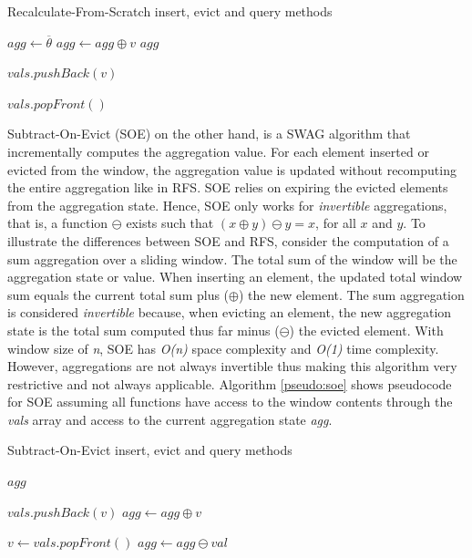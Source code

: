 \begin{algorithm}
    \caption[Recalculate-From-Scratch]{Recalculate-From-Scratch insert, evict and query methods}
    \label{pseudo:rfs}
    \begin{algorithmic}[1]
            \State $agg\gets\overline{\theta}$
                \State $agg \gets agg \oplus v$
            \EndFor
            \State \Return $agg$
        \EndFunction
        
            \State $vals.pushBack(v)$
        \EndFunction
        
            \State $vals.popFront()$
        \EndFunction
    \end{algorithmic}
\end{algorithm}

Subtract-On-Evict (SOE) on the other hand, is a SWAG algorithm that incrementally computes the aggregation value. For each element inserted or evicted from the window, the aggregation value is updated without recomputing the entire aggregation like in RFS. SOE relies on expiring the evicted elements from the aggregation state. Hence, SOE only works for \textit{invertible} aggregations, that is, a function $\ominus$ exists such that $(x \oplus y) \ominus y = x$, for all $x$ and $y$. To illustrate the differences between SOE and RFS, consider the computation of a sum aggregation over a sliding window. The total sum of the window will be the aggregation state or value. When inserting an element, the updated total window sum equals the current total sum plus ($\oplus$) the new element. The sum aggregation is considered \textit{invertible} because, when evicting an element, the new aggregation state is the total sum computed thus far minus ($\ominus$) the evicted element. With window size of \textit{n}, SOE has \textit{O(n)} space complexity and \textit{O(1)} time complexity. However, aggregations are not always invertible thus making this algorithm very restrictive and not always applicable. Algorithm \ref{pseudo:soe} shows pseudocode for SOE assuming all functions have access to the window contents through the \textit{vals} array and access to the current aggregation state \textit{agg}.

\begin{algorithm}
    \caption[Subtract-On-Evict]{Subtract-On-Evict insert, evict and query methods}
    \label{pseudo:soe}
    \begin{algorithmic}[1]
            \State \Return $agg$
        \EndFunction
        
            \State $vals.pushBack(v)$
            \State $agg \gets agg \oplus v$
        \EndFunction
        
            \State $v \gets vals.popFront()$
            \State $agg \gets agg \ominus val$
        \EndFunction
    \end{algorithmic}
\end{algorithm}

